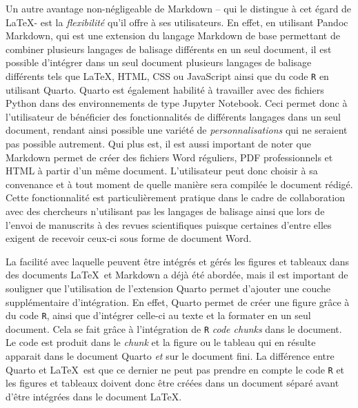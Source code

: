 \documentclass[
  letterpaper,
]{scrbook}
\begin{document}
Un autre avantage non-négligeable de Markdown -- qui le distingue à cet
égard de \LaTeX - est la \emph{flexibilité} qu'il offre à ses
utilisateurs. En effet, en utilisant Pandoc Markdown, qui est une
extension du langage Markdown de base permettant de combiner plusieurs
langages de balisage différents en un seul document, il est possible
d'intégrer dans un seul document plusieurs langages de balisage
différents tels que \LaTeX, HTML, CSS ou JavaScript ainsi que du code
\texttt{R} en utilisant Quarto. Quarto est également habilité à
travailler avec des fichiers Python dans des environnements de type
Jupyter Notebook. Ceci permet donc à l'utilisateur de bénéficier des
fonctionnalités de différents langages dans un seul document, rendant
ainsi possible une variété de \emph{personnalisations} qui ne seraient
pas possible autrement. Qui plus est, il est aussi important de noter
que Markdown permet de créer des fichiers Word réguliers, PDF
professionnels et HTML à partir d'un même document. L'utilisateur peut
donc choisir à sa convenance et à tout moment de quelle manière sera
compilée le document rédigé. Cette fonctionnalité est particulièrement
pratique dans le cadre de collaboration avec des chercheurs n'utilisant
pas les langages de balisage ainsi que lors de l'envoi de manuscrits à
des revues scientifiques puisque certaines d'entre elles exigent de
recevoir ceux-ci sous forme de document Word.

La facilité avec laquelle peuvent être intégrés et gérés les figures et
tableaux dans des documents \LaTeX~et Markdown a déjà été abordée, mais
il est important de souligner que l'utilisation de l'extension Quarto
permet d'ajouter une couche supplémentaire d'intégration. En effet,
Quarto permet de créer une figure grâce à du code \texttt{R}, ainsi que
d'intégrer celle-ci au texte et la formater en un seul document. Cela se
fait grâce à l'intégration de \texttt{R} \emph{code chunks} dans le
document. Le code est produit dans le \emph{chunk} et la figure ou le
tableau qui en résulte apparait dans le document Quarto \emph{et} sur le
document fini. La différence entre Quarto et \LaTeX~est que ce dernier
ne peut pas prendre en compte le code \texttt{R} et les figures et
tableaux doivent donc être créées dans un document séparé avant d'être
intégrées dans le document \LaTeX.
\end{document}
